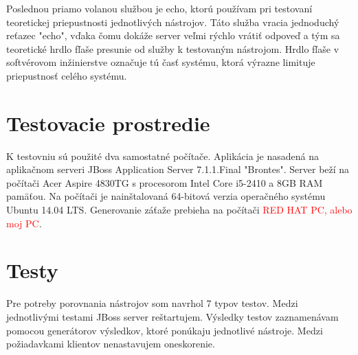 \documentclass[12pt,oneside,final]{fithesis-utf8}
\newcommand\todo[1]{\textcolor{red}{#1}}
\begin{document}
\par Poslednou priamo volanou službou je echo, ktorú používam pri testovaní teoretickej priepustnosti jednotlivých nástrojov. Táto služba vracia jednoduchý reťazec "{}echo", vďaka čomu dokáže server veľmi rýchlo vrátiť odpoveď a tým sa teoretické hrdlo fľaše presunie od služby k testovaným nástrojom. Hrdlo fľaše v softvérovom inžinierstve označuje tú časť systému, ktorá výrazne limituje priepustnosť celého systému.

\section{Testovacie prostredie}
K testovniu sú použité dva samostatné počítače. Aplikácia je nasadená na aplikačnom serveri JBoss Application Server 7.1.1.Final "{}Brontes". Server beží na počítači Acer Aspire 4830TG s procesorom Intel Core i5-2410 a 8GB RAM pamäťou. Na počítači je nainštalovaná 64-bitová verzia operačného systému Ubuntu 14.04 LTS. Generovanie záťaže prebieha na počítači \todo{RED HAT PC, alebo moj PC}.

\newpage
\section{Testy}
Pre potreby porovnania nástrojov som navrhol 7 typov testov. Medzi jednotlivými testami JBoss server reštartujem. Výsledky testov zaznamenávam pomocou generátorov výsledkov, ktoré ponúkaju jednotlivé nástroje. Medzi požiadavkami klientov nenastavujem oneskorenie.
\newline
\end{document}
